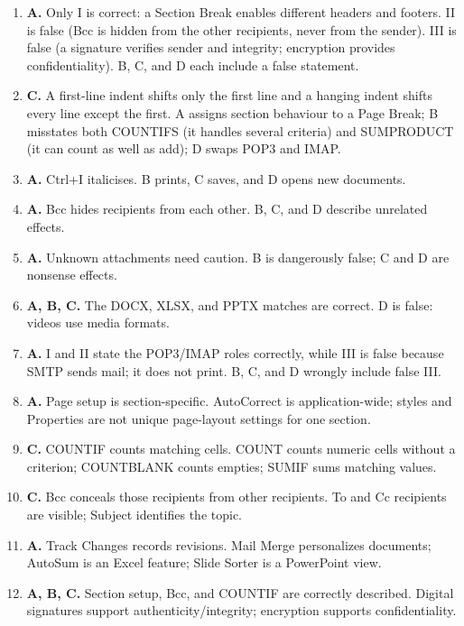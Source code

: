 \begin{enumerate}[label=\textbf{Q\arabic*.}, leftmargin=*]
  convert, so it cannot become SmartArt in one step without re-entry.
\item \textbf{A.} Only I is correct: a Section Break enables different headers
  and footers. II is false (Bcc is hidden from the other recipients, never
  from the sender). III is false (a signature verifies sender and integrity;
  encryption provides confidentiality). B, C, and D each include a false
  statement.
\item \textbf{C.} A first-line indent shifts only the first line and a hanging
  indent shifts every line except the first. A assigns section behaviour to a
  Page Break; B misstates both COUNTIFS (it handles several criteria) and
  SUMPRODUCT (it can count as well as add); D swaps POP3 and IMAP.

\item \textbf{A.} Ctrl+I italicises. B prints, C saves, and D opens new documents.
\item \textbf{A.} Bcc hides recipients from each other. B, C, and D describe unrelated effects.
\item \textbf{A.} Unknown attachments need caution. B is dangerously false; C and D are nonsense effects.
\item \textbf{A, B, C.} The DOCX, XLSX, and PPTX matches are correct. D is false: videos use media formats.
\item \textbf{A.} I and II state the POP3/IMAP roles correctly, while III is false because SMTP sends mail; it does not print. B, C, and D wrongly include false III.
\item \textbf{A.} Page setup is section-specific. AutoCorrect is application-wide; styles and Properties are not unique page-layout settings for one section.

\item \textbf{C.} COUNTIF counts matching cells. COUNT counts numeric cells without a criterion; COUNTBLANK counts empties; SUMIF sums matching values.

\item \textbf{C.} Bcc conceals those recipients from other recipients. To and Cc recipients are visible; Subject identifies the topic.

\item \textbf{A.} Track Changes records revisions. Mail Merge personalizes documents; AutoSum is an Excel feature; Slide Sorter is a PowerPoint view.

\item \textbf{A, B, C.} Section setup, Bcc, and COUNTIF are correctly described. Digital signatures support authenticity/integrity; encryption supports confidentiality.

\end{enumerate}
